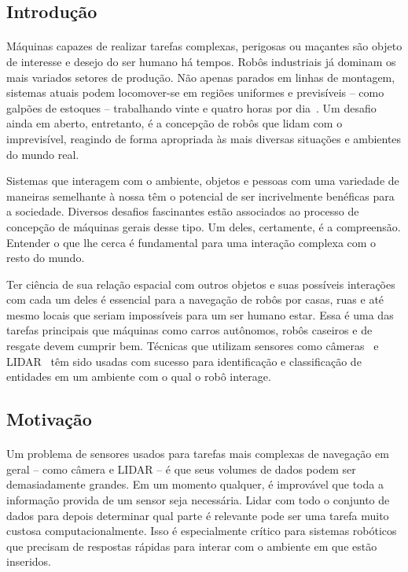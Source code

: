 \documentclass[8pt]{article}
\begin{document}
\begin{multicols}{2}

\section{Introdução}
\paragraph{}
Máquinas capazes de realizar tarefas complexas, perigosas ou maçantes são
objeto de interesse e desejo do ser humano há tempos. 
Robôs industriais já dominam os mais variados setores de produção. 
Não apenas parados em linhas de montagem, sistemas atuais podem locomover-se
em regiões uniformes e previsíveis -- como galpões de estoques -- trabalhando
vinte e quatro horas por dia~\cite{warehouse}.
Um desafio ainda em aberto, entretanto, é a concepção de robôs que lidam com 
o imprevisível, reagindo de forma apropriada às mais diversas situações 
e ambientes do mundo real. 

Sistemas que interagem com o ambiente, objetos e pessoas 
com uma variedade de maneiras semelhante à nossa têm o potencial de ser 
incrivelmente benéficas para a sociedade. 
Diversos desafios fascinantes estão associados ao processo de concepção de 
máquinas gerais desse tipo. 
Um deles, certamente, é a compreensão. 
Entender o que lhe cerca é fundamental para uma interação complexa com o resto
do mundo. 

Ter ciência de sua relação espacial com outros objetos e 
suas possíveis interações com cada um deles é essencial para a navegação 
de robôs por casas, ruas e até mesmo locais que seriam impossíveis 
para um ser humano estar. 
Essa é uma das tarefas principais que máquinas como carros autônomos, 
robôs caseiros e de resgate devem cumprir bem.
Técnicas que utilizam sensores como câmeras~\cite{vision} e LIDAR~\cite{car} 
têm sido usadas com sucesso para identificação e classificação de entidades 
em um ambiente com o qual o robô interage. 

\subsection{Motivação}
\paragraph{}
Um problema de sensores usados para tarefas mais complexas de navegação
em geral -- como câmera e LIDAR  --
é que seus volumes de dados podem ser demasiadamente grandes. 
Em um momento qualquer, é improvável que 
toda a informação provida de um sensor seja necessária. 
Lidar com todo o conjunto de dados para depois determinar qual parte é 
relevante pode ser uma tarefa muito custosa computacionalmente. 
Isso é especialmente crítico para sistemas robóticos que precisam de respostas
rápidas para interar com o ambiente em que estão inseridos. 


\end{multicols}
\end{document}
